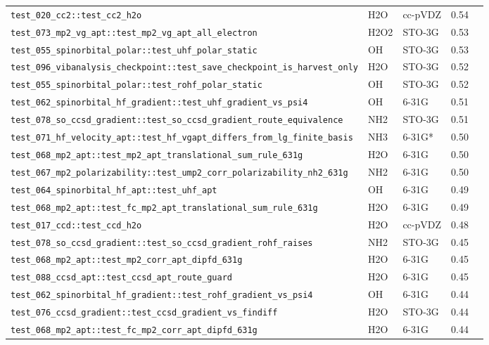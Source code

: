 \documentclass[10pt]{article}
\begin{document}
\begin{longtable}{l l l r c}
\texttt{test\_020\_cc2::test\_cc2\_h2o} & H2O & cc-pVDZ & 0.54 &  \\
\texttt{test\_073\_mp2\_vg\_apt::test\_mp2\_vg\_apt\_all\_electron} & H2O2 & STO-3G & 0.53 &  \\
\texttt{test\_055\_spinorbital\_polar::test\_uhf\_polar\_static} & OH & STO-3G & 0.53 &  \\
\texttt{test\_096\_vibanalysis\_checkpoint::test\_save\_checkpoint\_is\_harvest\_only} & H2O & STO-3G & 0.52 &  \\
\texttt{test\_055\_spinorbital\_polar::test\_rohf\_polar\_static} & OH & STO-3G & 0.52 &  \\
\texttt{test\_062\_spinorbital\_hf\_gradient::test\_uhf\_gradient\_vs\_psi4} & OH & 6-31G & 0.51 &  \\
\texttt{test\_078\_so\_ccsd\_gradient::test\_so\_ccsd\_gradient\_route\_equivalence} & NH2 & STO-3G & 0.51 &  \\
\texttt{test\_071\_hf\_velocity\_apt::test\_hf\_vgapt\_differs\_from\_lg\_finite\_basis} & NH3 & 6-31G{*} & 0.50 &  \\
\texttt{test\_068\_mp2\_apt::test\_mp2\_apt\_translational\_sum\_rule\_631g} & H2O & 6-31G & 0.50 &  \\
\texttt{test\_067\_mp2\_polarizability::test\_ump2\_corr\_polarizability\_nh2\_631g} & NH2 & 6-31G & 0.50 &  \\
\texttt{test\_064\_spinorbital\_hf\_apt::test\_uhf\_apt} & OH & 6-31G & 0.49 &  \\
\texttt{test\_068\_mp2\_apt::test\_fc\_mp2\_apt\_translational\_sum\_rule\_631g} & H2O & 6-31G & 0.49 &  \\
\texttt{test\_017\_ccd::test\_ccd\_h2o} & H2O & cc-pVDZ & 0.48 &  \\
\texttt{test\_078\_so\_ccsd\_gradient::test\_so\_ccsd\_gradient\_rohf\_raises} & NH2 & STO-3G & 0.45 &  \\
\texttt{test\_068\_mp2\_apt::test\_mp2\_corr\_apt\_dipfd\_631g} & H2O & 6-31G & 0.45 &  \\
\texttt{test\_088\_ccsd\_apt::test\_ccsd\_apt\_route\_guard} & H2O & 6-31G & 0.45 &  \\
\texttt{test\_062\_spinorbital\_hf\_gradient::test\_rohf\_gradient\_vs\_psi4} & OH & 6-31G & 0.44 &  \\
\texttt{test\_076\_ccsd\_gradient::test\_ccsd\_gradient\_vs\_findiff} & H2O & STO-3G & 0.44 &  \\
\texttt{test\_068\_mp2\_apt::test\_fc\_mp2\_corr\_apt\_dipfd\_631g} & H2O & 6-31G & 0.44 &  \\

\end{longtable}
\end{document}
